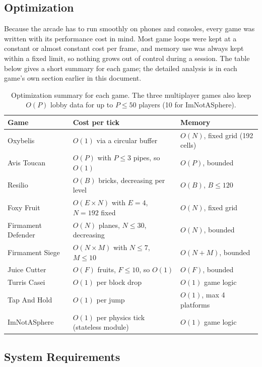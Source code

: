 \documentclass[12pt,letterpaper]{article}
\begin{document}
\subsection{Optimization}

Because the arcade has to run smoothly on phones and consoles, every game was written with its performance cost in mind. Most game loops were kept at a constant or almost constant cost per frame, and memory use was always kept within a fixed limit, so nothing grows out of control during a session. The table below gives a short summary for each game; the detailed analysis is in each game's own section earlier in this document.

\begin{table}[H]
\centering
\footnotesize
\begin{tabular}{|p{3.2cm}|p{7cm}|p{5cm}|}
\hline
\textbf{Game} & \textbf{Cost per tick} & \textbf{Memory} \\
\hline
Oxybelis & $O(1)$ via a circular buffer & $O(N)$, fixed grid (192 cells) \\
\hline
Avis Toucan & $O(P)$ with $P \leq 3$ pipes, so $O(1)$ & $O(P)$, bounded \\
\hline
Resilio & $O(B)$ bricks, decreasing per level & $O(B)$, $B \leq 120$ \\
\hline
Foxy Fruit & $O(E \times N)$ with $E=4$, $N=192$ fixed & $O(N)$, fixed grid \\
\hline
Firmament Defender & $O(N)$ planes, $N \leq 30$, decreasing & $O(N)$, bounded \\
\hline
Firmament Siege & $O(N \times M)$ with $N \leq 7$, $M \leq 10$ & $O(N+M)$, bounded \\
\hline
Juice Cutter & $O(F)$ fruits, $F \leq 10$, so $O(1)$ & $O(F)$, bounded \\
\hline
Turris Casei & $O(1)$ per block drop & $O(1)$ game logic \\
\hline
Tap And Hold & $O(1)$ per jump & $O(1)$, max 4 platforms \\
\hline
ImNotASphere & $O(1)$ per physics tick (stateless module) & $O(1)$ game logic \\
\hline
\end{tabular}
\caption{Optimization summary for each game. The three multiplayer games also keep $O(P)$ lobby data for up to $P \leq 50$ players (10 for ImNotASphere).}
\end{table}

\subsection{System Requirements}
\end{document}
